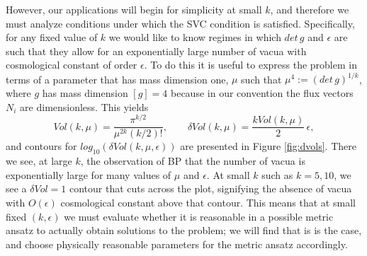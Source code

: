\documentclass[a4paper,11pt]{article}
\begin{document}
However, our applications will begin for simplicity at small
$k$, and therefore we must analyze conditions under which
the SVC condition is satisfied. Specifically, for any
fixed value of $k$ we would like to know regimes in which
$det \, g$ and $\epsilon$ are such that they allow for an
exponentially large number of vacua with cosmological
constant of order $\epsilon$. To do this it is useful
to express the problem in terms of a parameter
that has
mass dimension one, $\mu$ such that $\mu^4:=(det\, g)^{1/k}$,
where $g$ has mass dimension $[g]=4$ because in our
convention the flux vectors $N_i$ are dimensionless.
This yields
\begin{equation}
Vol(k,\mu) = \frac{\pi^{k/2}}{\mu^{2k}(k/2)!}, \qquad \delta Vol(k,\mu) = \frac{k Vol(k,\mu)}{2} \, \epsilon,
\end{equation}
and contours for $log_{10}(\delta Vol(k,\mu,\epsilon))$ are presented
in Figure \ref{fig:dvols}. There we see, at large $k$, the 
observation of BP that the number of vacua is exponentially
large for many values of $\mu$ and $\epsilon$.
At small $k$ such as $k=5,10$, we see a $\delta Vol = 1$ contour
that cuts across the plot, signifying the absence of vacua
with $O(\epsilon)$ cosmological constant above that contour.
This means that at small fixed $(k,\epsilon)$ 
we must evaluate whether it is reasonable in a possible metric 
ansatz to actually obtain solutions to the problem; we will find
that is is the case, and choose physically reasonable parameters
for the metric ansatz accordingly.
\end{document}

